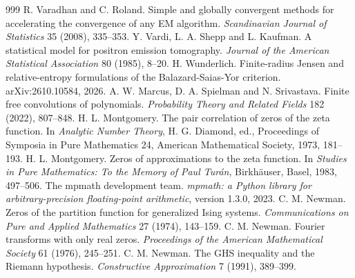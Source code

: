 \begin{thebibliography}{999}
 R. Varadhan and C. Roland. Simple and globally convergent methods for accelerating the convergence of any EM algorithm. \emph{Scandinavian Journal of Statistics} 35 (2008), 335--353.
 Y. Vardi, L. A. Shepp and L. Kaufman. A statistical model for positron emission tomography. \emph{Journal of the American Statistical Association} 80 (1985), 8--20.
 H. Wunderlich. Finite-radius Jensen and relative-entropy formulations of the Balazard-Saias-Yor criterion. arXiv:2610.10584, 2026.
 A. W. Marcus, D. A. Spielman and N. Srivastava. Finite free convolutions of polynomials. \emph{Probability Theory and Related Fields} 182 (2022), 807--848.
 H. L. Montgomery. The pair correlation of zeros of the zeta function. In \emph{Analytic Number Theory}, H. G. Diamond, ed., Proceedings of Symposia in Pure Mathematics 24, American Mathematical Society, 1973, 181--193.
 H. L. Montgomery. Zeros of approximations to the zeta function. In \emph{Studies in Pure Mathematics: To the Memory of Paul Tur\'an}, Birkh\"auser, Basel, 1983, 497--506.
 The mpmath development team. \emph{mpmath: a Python library for arbitrary-precision floating-point arithmetic}, version 1.3.0, 2023.
 C. M. Newman. Zeros of the partition function for generalized Ising systems. \emph{Communications on Pure and Applied Mathematics} 27 (1974), 143--159.
 C. M. Newman. Fourier transforms with only real zeros. \emph{Proceedings of the American Mathematical Society} 61 (1976), 245--251.
 C. M. Newman. The GHS inequality and the Riemann hypothesis. \emph{Constructive Approximation} 7 (1991), 389--399.

\end{thebibliography}
